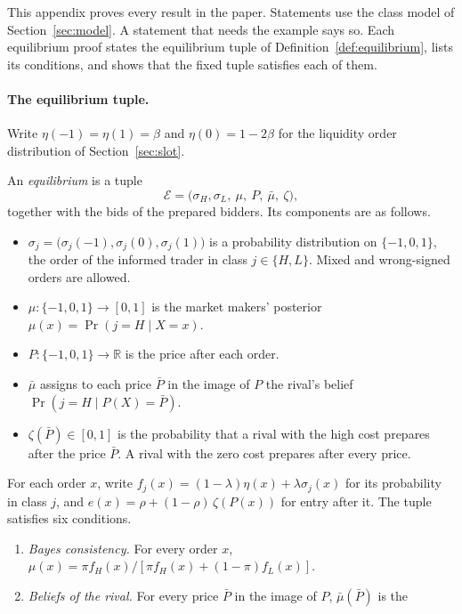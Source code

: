 This appendix proves every result in the paper. Statements use the class model of Section~\ref{sec:model}. A
statement that needs the example says so. Each equilibrium proof states the equilibrium tuple of
Definition~\ref{def:equilibrium}, lists its conditions, and shows that the fixed tuple satisfies each of them.

\paragraph{The equilibrium tuple.}
Write \(\eta(-1)=\eta(1)=\beta\) and \(\eta(0)=1-2\beta\) for the liquidity order distribution of
Section~\ref{sec:slot}.

\begin{definition}[Equilibrium]\label{def:equilibrium}
An \emph{equilibrium} is a tuple
\[
\mathcal{E}=\bigl(\sigma_H,\sigma_L,\ \mu,\ P,\ \bar\mu,\ \zeta\bigr),
\]
together with the bids of the prepared bidders. Its components are as follows.
\begin{itemize}[leftmargin=2em]
\item \(\sigma_j=\bigl(\sigma_j(-1),\sigma_j(0),\sigma_j(1)\bigr)\) is a probability distribution on
\(\{-1,0,1\}\), the order of the informed trader in class \(j\in\{H,L\}\). Mixed and wrong-signed orders are
allowed.
\item \(\mu:\{-1,0,1\}\to[0,1]\) is the market makers' posterior \(\mu(x)=\Pr(j=H\mid X=x)\).
\item \(P:\{-1,0,1\}\to\mathbb{R}\) is the price after each order.
\item \(\bar\mu\) assigns to each price \(\bar P\) in the image of \(P\) the rival's belief
\(\Pr(j=H\mid P(X)=\bar P)\).
\item \(\zeta(\bar P)\in[0,1]\) is the probability that a rival with the high cost prepares after the price
\(\bar P\). A rival with the zero cost prepares after every price.
\end{itemize}
For each order \(x\), write \(f_j(x)=(1-\lambda)\eta(x)+\lambda\sigma_j(x)\) for its probability in class
\(j\), and \(e(x)=\rho+(1-\rho)\,\zeta(P(x))\) for entry after it. The tuple satisfies six conditions.
\begin{enumerate}[label=(E\arabic*),leftmargin=3em]
\item \emph{Bayes consistency.} For every order \(x\),
\(\mu(x)=\pi f_H(x)/[\pi f_H(x)+(1-\pi)f_L(x)]\).
\item \emph{Beliefs of the rival.} For every price \(\bar P\) in the image of \(P\), \(\bar\mu(\bar P)\) is the

\end{enumerate}
\end{definition}
